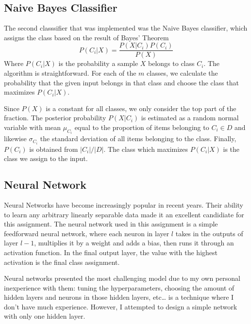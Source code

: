 \documentclass[
  paper=a4,
,captions=tableheading
]{scrartcl}
\begin{document}
\hypertarget{naive-bayes-classifier}{%
\subsection{Naive Bayes Classifier}\label{naive-bayes-classifier}}

The second classsifier that was implemented was the Naive Bayes
classifier, which assigns the class based on the result of Bayes'
Theorem \begin{equation}
    P(C_{i}|X) = \frac{P(X|C_{i})P(C_{i})}{P(X)}
\end{equation} Where \(P(C_{i}|X)\) is the probability a sample \(X\)
belongs to class \(C_{i}\). The algorithm is straightforward. For each
of the \(m\) classes, we calculate the probability that the given input
belongs in that class and choose the class that maximizes
\(P(C_{i}|X)\).

Since \(P(X)\) is a constant for all classes, we only consider the top
part of the fraction. The posterior probability \(P(X|C_{i})\) is
estimated as a random normal variable with mean \(\mu_{C_{i}}\) equal to
the proportion of items belonging to \(C_{i} \in D\) and likewise
\(\sigma_{C_{i}}\) the standard deviation of all items belonging to the
class. Finally, \(P(C_{i})\) is obtained from \(|C_{i}|/|D|\). The class
which maximizes \(P(C_{i}|X)\) is the class we assign to the input.

\hypertarget{neural-network}{%
\subsection{Neural Network}\label{neural-network}}

Neural Networks have become increasingly popular in recent years. Their
ability to learn any arbitrary linearly separable data made it an
excellent candidiate for this assignment. The neural network used in
this assignment is a simple feedforward neural network, where each
neuron in layer \(l\) takes in the outputs of layer \(l-1\), multiplies
it by a weight and adds a bias, then runs it through an activation
function. In the final output layer, the value with the highest
activation is the final class assignment.

Neural networks presented the most challenging model due to my own
personal inexperience with them: tuning the hyperparameters, choosing
the amount of hidden layers and neurons in those hidden layers,
etc\ldots{} is a technique where I don't have much experience. However,
I attempted to design a simple network with only one hidden layer.
\end{document}
